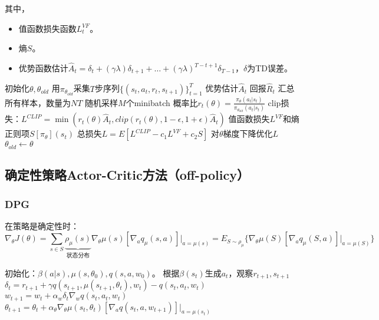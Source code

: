 \documentclass[
12pt, %
a4paper, 
oneside, %
headinclude,footinclude, %
]{scrartcl}
\begin{document}
其中，
\begin{itemize}
\item 值函数损失函数$ L_t^{VF} $。
\item 熵$ S $。
\item 优势函数估计$ \hat{A}_t = \delta_t + (\gamma\lambda)\delta_{t + 1} + \dots + (\gamma\lambda)^{T - t + 1}\delta_{T - 1} $，$ \delta $为TD误差。
\end{itemize}
\begin{myalgorithm}[PPO]
\State 初始化$ \theta, \theta_{old} $
\State 用$ \pi_{\theta_{old}} $采集$ T $步序列$ \{(s_t, a_t, r_t, s_{t + 1})\}_{t = 1}^T $
\State 优势估计$ \hat{A}_t $
\State 回报$ \hat{R}_t $
\EndFor
\State 汇总所有样本，数量为$ NT $
\State 随机采样$ M $个minibatch
\State 概率比$ r_t(\theta) = \frac{\pi_\theta(a_t|s_t)}{\pi_{\theta_{old}}(a_t|s_t)} $
\State clip损失：$ L^{CLIP} = \min(r_t(\theta)\hat{A}_t, clip(r_t(\theta), 1 - \epsilon, 1 + \epsilon)\hat{A}_t) $
\State 值函数损失$ L^{VF} $和熵正则项$ S[\pi_\theta](s_t) $
\State 总损失$ L = E[L^{CLIP} - c_1 L^{VF} + c_2 S] $
\State 对$ \theta $梯度下降优化$ L $
\EndFor
\State $ \theta_{old} \gets \theta $
\EndFor
\end{myalgorithm}
\subsection[确定性策略Actor-Critic方法]{确定性策略Actor-Critic方法（off-policy）}
\subsubsection[DPG]{DPG}
在策略是确定性时：
$$ \nabla_\theta J(\theta) = \sum_{s \in S} \underbrace{\rho_\mu(s)}_{\text{状态分布}} \nabla_\theta \mu(s)[\nabla_a q_\mu(s, a)]\bigg|_{a = \mu(s)} = E_{S \sim \rho_\mu}\{\nabla_\theta \mu(S)[\nabla_a q_\mu(S, a)]\bigg|_{a =\mu(S)}\} $$
\begin{myalgorithm}
\State 初始化：$ \beta(a|s), \mu(s, \theta_0), q(s, a, w_0) $。
\State 根据$ \beta(s_t) $生成$ a_t $，观察$ r_{t + 1}, s_{t + 1} $
\State $ \delta_t = r_{t + 1} + \gamma q(s_{t + 1}, \mu(s_{t + 1}, \theta_t), w_t) - q(s_t, a_t, w_t) $ 
\State $ w_{t + 1} = w_t + \alpha_w \delta_t \nabla_w q(s_t, a_t, w_t) $ 
\State $ \theta_{t + 1} = \theta_t + \alpha_\theta \nabla_\theta \mu(s_t, \theta_t)[\nabla_a q(s_t, a, w_{t + 1})]|_{a = \mu(s_t)} $ 
\EndFor
\EndFor
\end{myalgorithm}
\end{document}
